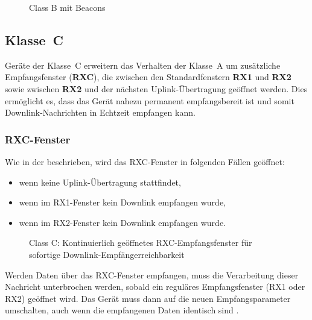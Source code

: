 	\begin{figure}[H]
		\centering
		\resizebox{0.9\textwidth}{!}{
			\begin{tikzpicture}
				\deviceClassB
			\end{tikzpicture}
		}
		\caption{Class B mit Beacons}
	\end{figure}
	

\subsection{Klasse~C}
	Geräte der Klasse~C erweitern das Verhalten der Klasse~A um zusätzliche Empfangsfenster (\textbf{RXC}), die zwischen den Standardfenstern \textbf{RX1} und \textbf{RX2} sowie zwischen \textbf{RX2} und der nächsten Uplink-Übertragung geöffnet werden. Dies ermöglicht es, dass das Gerät nahezu permanent empfangsbereit ist und somit Downlink-Nachrichten in Echtzeit empfangen kann.

\subsubsection{RXC-Fenster}
	Wie in  der \textcite{LoRaAlliance:2020b} beschrieben, wird das RXC-Fenster in folgenden Fällen geöffnet:
	\begin{itemize}
		\item wenn keine Uplink-Übertragung stattfindet,
		\item wenn im RX1-Fenster kein Downlink empfangen wurde,
		\item wenn im RX2-Fenster kein Downlink empfangen wurde.
	\end{itemize}
	
	\begin{figure}[H]
		\centering
		\resizebox{0.9\textwidth}{!}{
			\begin{tikzpicture}
				\deviceClassC
			\end{tikzpicture}
		}
		\caption{Class C: Kontinuierlich geöffnetes RXC-Empfangsfenster für sofortige Downlink-Empfängerreichbarkeit \cite{LoRaAlliance:2020b}}
	\end{figure}
	
	Werden Daten über das RXC-Fenster empfangen, 
	muss die Verarbeitung dieser Nachricht unterbrochen werden, sobald ein reguläres Empfangsfenster (RX1 oder RX2) geöffnet wird. Das Gerät muss dann auf die neuen Empfangsparameter umschalten, 
	auch wenn die empfangenen Daten identisch sind \cite[75]{LoRaAlliance:2020b}.


